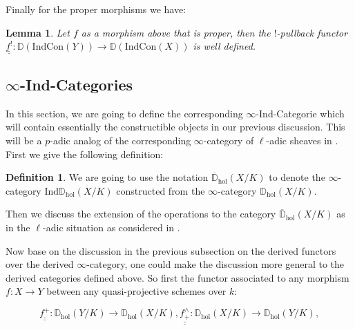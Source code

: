\documentclass[11pt]{book}
\newtheorem{lemma}[theorem]{Lemma}
\theoremstyle{definition}
\newtheorem{definition}[theorem]{Definition}
\numberwithin{equation}{section}
\begin{document}
\indent Finally for the proper morphisms we have:

\begin{lemma}
Let $f$ as a morphism above that is proper, then the $!$-pullback functor $\underline{\underline{f^!}}:\mathbb{D}(\mathrm{Ind}\mathrm{Con}(Y))\rightarrow \mathbb{D}(\mathrm{Ind}\mathrm{Con}(X))$ is well defined.	
\end{lemma}













\newpage
\subsection{$\infty$-Ind-Categories}

\noindent In this section, we are going to define the corresponding $\infty$-Ind-Categorie which will contain essentially the constructible objects in our previous discussion. This will be a $p$-adic analog of the corresponding $\infty$-category of $\ell$-adic sheaves in \cite{GL1}. First we give the following definition:


\begin{definition}
We are going to use the notation $\overline{\mathbb{D}}_\mathrm{hol}(X/K)$	to denote the $\infty$-category $\mathrm{Ind}\mathbb{D}_\mathrm{hol}(X/K)$ constructed from the $\infty$-category $\mathbb{D}_\mathrm{hol}(X/K)$.
\end{definition}


\indent Then we discuss the extension of the operations to the category $\overline{\mathbb{D}}_\mathrm{hol}(X/K)$ as in the $\ell$-adic situation as considered in \cite{GL1}.





\indent Now base on the discussion in the previous subsection on the derived functors over the derived $\infty$-category, one could make the discussion more general to the derived categories defined above. So first the functor associated to any morphism $f:X\rightarrow Y$ between any quasi-projective schemes over $k$:

\begin{displaymath}
\underline{\underline{f^+}}: \mathbb{D}_\mathrm{hol}(Y/K)\rightarrow \mathbb{D}_\mathrm{hol}(X/K),\underline{\underline{f^\wedge_+}}: \mathbb{D}_\mathrm{hol}(X/K)\rightarrow \mathbb{D}_\mathrm{hol}(Y/K),	
\end{displaymath}
\end{document}
